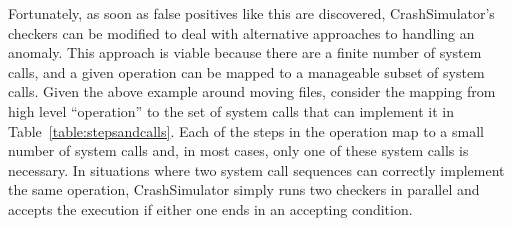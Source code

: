 Fortunately, as soon as false positives like this are discovered,
CrashSimulator's checkers can be modified to deal with alternative
approaches to handling an anomaly.
This approach is viable because there are a finite number of system calls, and a
given operation can be mapped to a manageable subset of system calls.  Given the
above example around moving files, consider the mapping from high level
``operation'' to the set of system calls that can implement it in
Table~\ref{table:stepsandcalls}.  Each of the steps in the operation map to a small
number of system calls and, in most cases, only one of these system calls is
necessary.  In situations where two system call sequences can correctly
implement the same operation, CrashSimulator simply runs two checkers
in parallel and accepts the execution if either one ends in an accepting
condition.

